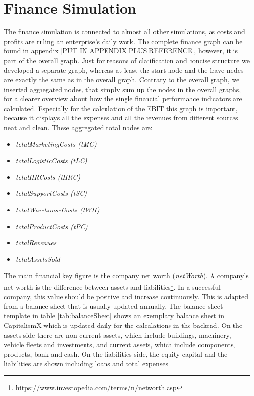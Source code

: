 \section{Finance Simulation}
\label{sec:finance_simulation}

The finance simulation is connected to almost all other simulations, as costs and profits are ruling an enterprise's daily work. The complete finance graph can be found in appendix [PUT IN APPENDIX PLUS REFERENCE], however, it is part of the overall graph. Just for reasons of clarification and concise structure we developed a separate graph, whereas at least the start node and the leave nodes are exactly the same as in the overall graph. Contrary to the overall graph, we inserted aggregated nodes, that simply sum up the nodes in the overall graphs, for a clearer overview about how the single financial performance indicators are calculated. Especially for the calculation of the \gls{EBIT} this graph is important, because it displays all the expenses and all the revenues from different sources neat and clean. These aggregated total nodes are:
\begin{itemize}
    \item \textit{totalMarketingCosts (tMC)}
    \item \textit{totalLogisticCosts (tLC)}
    \item \textit{totalHRCosts (tHRC)}
    \item \textit{totalSupportCosts (tSC)}
    \item \textit{totalWarehouseCosts (tWH)}
    \item \textit{totalProductCosts (tPC)}
    \item \textit{totalRevenues}
    \item \textit{totalAssetsSold}
\end{itemize}


The main financial key figure is the company net worth (\textit{netWorth}). A company's net worth is the difference between assets and liabilities\footnote{https://www.investopedia.com/terms/n/networth.asp}. In a successful company, this value should be positive and increase continuously. This is adapted from a balance sheet that is usually updated annually. The balance sheet template in table \ref{tab:balanceSheet} shows an exemplary balance sheet in CapitalismX which is updated daily for the calculations in the backend. On the assets side there are non-current assets, which include buildings, machinery, vehicle fleets and investments, and current assets, which include components, products, bank and cash. On the liabilities side, the equity capital and the liabilities are shown including loans and total expenses. 

